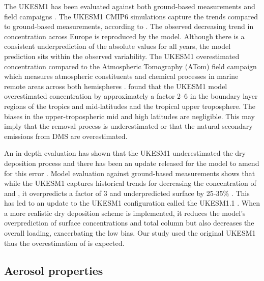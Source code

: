 The UKESM1 has been evaluated against both ground-based measurements and field campaigns \citep[e.g.][]{griffithsTroposphericOzoneCMIP62021, russoSeasonalInterannualDecadal2023}. The UKESM1 CMIP6 simulations capture the  trends compared to ground-based measurements, according to \citet{mulcahyDescriptionEvaluationAerosol2020}. The observed decreasing trend in  concentration across Europe is reproduced by the model. Although there is a consistent underprediction of the absolute values for all years, the model prediction sits within the observed variability. The UKESM1 overestimated  concentration compared to the Atmospheric Tomography (ATom) field campaign which measures atmospheric constituents and chemical processes in marine remote areas across both hemispheres \citep{ranjithkumarConstraintsGlobalAerosol2021}. \citet{ranjithkumarConstraintsGlobalAerosol2021} found that the UKESM1 model overestimated  concentration by approximately a factor 2–6 in the boundary layer regions of the tropics and mid-latitudes and the tropical upper troposphere. The biases in the upper-tropospheric mid and high latitudes are negligible. This may imply that the  removal process is underestimated or that the natural secondary emissions from DMS are overestimated.  

An in-depth evaluation has shown that the UKESM1 underestimated the dry deposition process and there has been an update released for the model to amend for this error \citep{hardacreEvaluationSO2SO422021}. Model evaluation against ground-based measurements shows that while the UKESM1 captures historical trends for decreasing the concentration of  and , it overpredicts  a factor of 3 and underpredicted surface  by 25-35\% \citep{hardacreEvaluationSO2SO422021}. This has led to an update to the UKESM1 configuration called the UKESM1.1 \citep{mulcahyUKESM1DevelopmentEvaluation2022}. When a more realistic dry deposition scheme is implemented, it reduces the model’s overprediction of surface  concentrations and total column  but also decreases the overall  loading, exacerbating the low bias.  Our study used the original UKESM1 thus the overestimation of  is expected.



\subsection{Aerosol properties}

